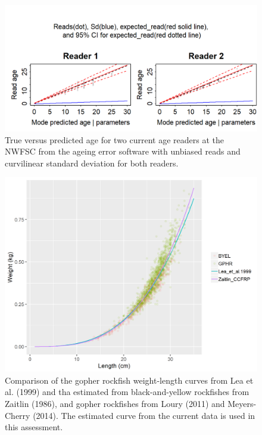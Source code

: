 \documentclass[12pt,]{article}
\begin{document}
\FloatBarrier

\begin{figure}
\centering
\includegraphics{Figures/GBY_age_error2.png}
\caption{True versus predicted age for two current age readers at the
NWFSC from the ageing error software with unbiased reads and curvilinear
standard deviation for both readers. \label{fig:GBY_age_error2}}
\end{figure}

\begin{figure}
\centering
\includegraphics{Figures/GBY_weight_length.png}
\caption{Comparison of the gopher rockfish weight-length curves from Lea
et al. (1999) and tha estimated from black-and-yellow rockfishes from
Zaitlin (1986), and gopher rockfishes from Loury (2011) and
Meyers-Cherry (2014). The estimated curve from the current data is used
in this assessment. \label{fig:GBY_weight_length}}
\end{figure}
\end{document}
